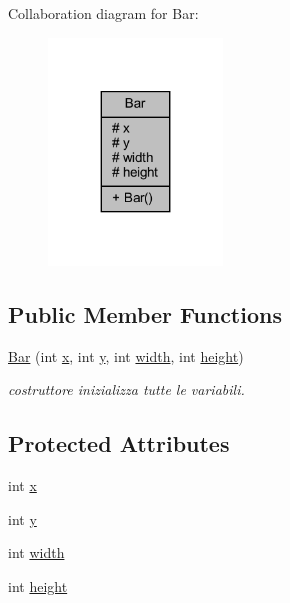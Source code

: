 Collaboration diagram for Bar\+:\nopagebreak
\begin{figure}[H]
\begin{center}
\leavevmode
\includegraphics[width=131pt]{classui_1_1_bar__coll__graph}
\end{center}
\end{figure}
\subsection*{Public Member Functions}
\begin{DoxyCompactItemize}
\item 
\hyperlink{classui_1_1_bar_a9048e88559d1d799814949815b2ab2d9}{Bar} (int \hyperlink{classui_1_1_bar_a6150e0515f7202e2fb518f7206ed97dc}{x}, int \hyperlink{classui_1_1_bar_a0a2f84ed7838f07779ae24c5a9086d33}{y}, int \hyperlink{classui_1_1_bar_a2474a5474cbff19523a51eb1de01cda4}{width}, int \hyperlink{classui_1_1_bar_ad12fc34ce789bce6c8a05d8a17138534}{height})
\begin{DoxyCompactList}\small\item\em costruttore inizializza tutte le variabili. \end{DoxyCompactList}\end{DoxyCompactItemize}
\subsection*{Protected Attributes}
\begin{DoxyCompactItemize}
\item 
int \hyperlink{classui_1_1_bar_a6150e0515f7202e2fb518f7206ed97dc}{x}
\item 
int \hyperlink{classui_1_1_bar_a0a2f84ed7838f07779ae24c5a9086d33}{y}
\item 
int \hyperlink{classui_1_1_bar_a2474a5474cbff19523a51eb1de01cda4}{width}
\item 
int \hyperlink{classui_1_1_bar_ad12fc34ce789bce6c8a05d8a17138534}{height}
\end{DoxyCompactItemize}


